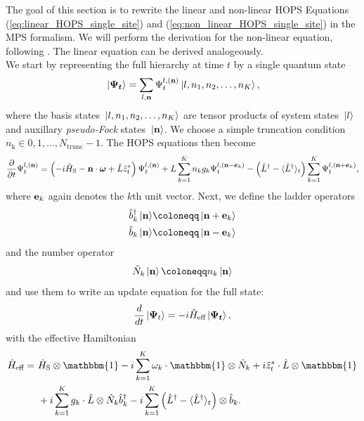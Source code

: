 The goal of this section is to rewrite the linear and non-linear HOPS Equations (\ref{eq:linear_HOPS_single_site}) and (\ref{eq:non_linear_HOPS_single_site})
in the MPS formalism. We will perform the derivation for the non-linear
equation, following \cite{Gao:2022}. The linear equation can be derived analogeously.
\\
We start by representing the full hierarchy at time $t$ by a single quantum state
\begin{equation}
    \label{eq:full_HOPS_state_non_mps}
        \ket*{\vb*{\Psi_t}} = \sum_{l, \vb{n}} \Psi_t^{l,(\vb{n})} \ket*{l, n_1, n_2, \dots, n_{K}},
\end{equation}
where the basis states $\ket*{l, n_1, n_2, \dots, n_{K}}$ are tensor products of system states $\ket*{l}$
and auxillary \textit{pseudo-Fock} states $\ket*{\vectorbold{n}}$. We choose a simple truncation condition
$n_\text{k} \in {0, 1, \dots, N_\text{trunc}-1}$.
The HOPS equations then become
\begin{equation*}
    \frac{\partial}{\partial t}\Psi_t^{l,(\vb{n})} = \left(
        -i\hat{H}_\text{S} - \vectorbold{n}\cdot\boldsymbol{\omega} + \hat{L}\tilde{z}_t^*
    \right) \Psi_t^{l,(\vb{n})}
    + L\sum_{k=1}^{K}n_kg_k\Psi_t^{l,(\vb{n}-\vb*{e}_k)}
    - \left(
        \hat{L}^\dagger - \langle
        \hat{L}^\dagger
    \rangle_t
    \right)\sum_{k=1}^{K}\Psi_t^{l,(\vb{n}+\vb*{e}_k)},
\end{equation*}
where $\vb{e}_k$ again denotes the $k$th unit vector. Next, we define the ladder operators
\begin{equation*}
    \begin{split}
        \hat{b}_k^\dagger \ket*{\vb{n}} &\coloneqq \ket*{\vb{n} + \vb{e}_k} \\
        \hat{b}_k \ket*{\vb{n}} &\coloneqq \ket*{\vb{n} - \vb{e}_k}
    \end{split}
\end{equation*}
and the number operator
\begin{equation*}
    \hat{N}_k \ket*{\vb{n}} \coloneqq n_k \ket*{\vb{n}}
\end{equation*}
and use them to write an update equation for the full state:
\begin{equation*}
    \frac{d}{d t}\ket*{\vb*{\Psi}_t} = -i\hat{H}_\text{eff} \ket*{\vb*{\Psi_t}},
\end{equation*}
with the effective Hamiltonian
\begin{equation}
    \label{eq:effective_HOPS_Hamiltonian_multiple_bath_modes}
    \begin{split}
        \hat{H}_\text{eff} = \,\,&\hat{H}_\text{S} \otimes \mathbbm{1} - i\sum_{k=1}^{K} \omega_k \cdot \mathbbm{1} \otimes \hat{N}_k + i\tilde{z}_t^*\cdot\hat{L} \otimes \mathbbm{1}\\
        &+ i\sum_{k=1}^{K} g_k \cdot \hat{L} \otimes \hat{N}_k\hat{b}^\dagger_k - i\sum_{k=1}^{K} \left(\hat{L}^\dagger - \langle\hat{L}^\dagger\rangle_t\right) \otimes \hat{b}_k.
    \end{split}
\end{equation}
